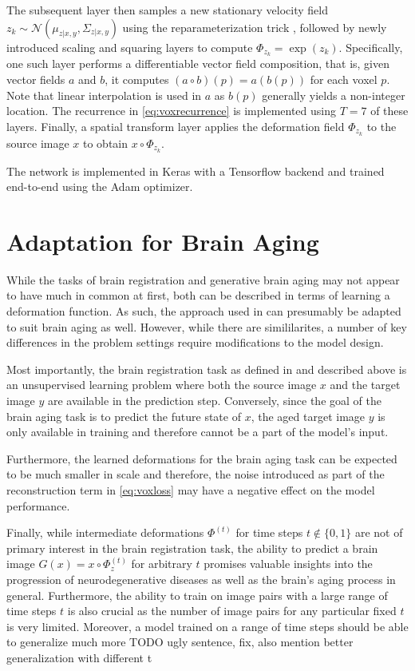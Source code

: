 The subsequent layer then samples a new stationary velocity field $z_k \sim \mathcal{N}(\mu_{z | x, y}, \Sigma_{z | x, y})$ using the reparameterization trick \cite{kingma2013}, followed by newly introduced scaling and squaring layers to compute $\Phi_{z_k} = \exp(z_k)$. Specifically, one such layer performs a differentiable vector field composition, that is, given vector fields $a$ and $b$, it computes $(a \circ b)(p) = a(b(p))$ for each voxel $p$. Note that linear interpolation is used in $a$ as $b(p)$ generally yields a non-integer location. The recurrence in \autoref{eq:voxrecurrence} is implemented using $T = 7$ of these layers. Finally, a spatial transform layer applies the deformation field $\Phi_{z_k}$ to the source image $x$ to obtain $x \circ \Phi_{z_k}$.

The network is implemented in Keras with a Tensorflow backend and trained end-to-end using the Adam \cite{Adam} optimizer.

\section{Adaptation for Brain Aging}
While the tasks of brain registration and generative brain aging may not appear to have much in common at first, both can be described in terms of learning a deformation function. As such, the approach used in \cite{voxelmorph} can presumably be adapted to suit brain aging as well. However, while there are simililarites, a number of key differences in the problem settings require modifications to the model design.

Most importantly, the brain registration task as defined in \cite{voxelmorph} and described above is an unsupervised learning problem where both the source image $x$ and the target image $y$ are available in the prediction step. Conversely, since the goal of the brain aging task is to predict the future state of $x$, the aged target image $y$ is only available in training and therefore cannot be a part of the model's input.

Furthermore, the learned deformations for the brain aging task can be expected to be much smaller in scale and therefore, the noise introduced as part of the reconstruction term in \autoref{eq:voxloss} may have a negative effect on the model performance.

Finally, while intermediate deformations $\Phi^{(t)}$ for time steps $t \notin \{0, 1\}$ are not of primary interest in the brain registration task, the ability to predict a brain image $G(x) = x \circ \Phi_z^{(t)}$ for arbitrary $t$ promises valuable insights into the progression of neurodegenerative diseases as well as the brain's aging process in general.
Furthermore, the ability to train on image pairs with a large range of time steps $t$ is also crucial as the number of image pairs for any particular fixed $t$ is very limited. Moreover, a model trained on a range of time steps should be able to generalize much more  TODO ugly sentence, fix, also mention better generalization with different t

